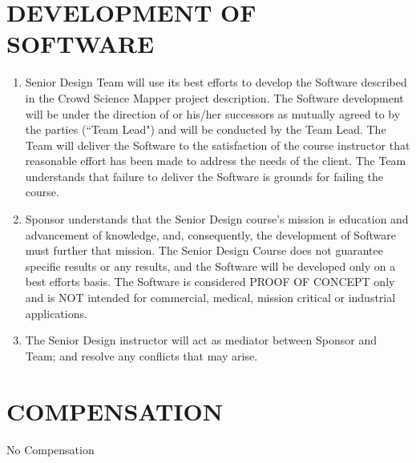 \documentclass[11pt]{article}
\begin{document}
\section{DEVELOPMENT OF SOFTWARE }
\begin{enumerate}  \itemsep4pt \parskip0pt 
\item  Senior Design Team will use its best efforts to develop the Software described in the Crowd Science Mapper project description. The Software development will be under the direction of  or his/her successors as mutually agreed to by the parties (``Team Lead") and will be conducted by the Team Lead.  The Team will deliver the Software to the satisfaction of the course instructor that reasonable effort has been made to address the needs of the client.  The Team understands that failure to deliver the Software is grounds for failing the course. 

\item  Sponsor understands that the Senior Design course's mission is education and advancement of knowledge, and, consequently, the development of Software must further that mission. The Senior Design Course does not guarantee specific results or any results, and the Software will be developed only on a best efforts basis.  The Software is considered PROOF OF CONCEPT only and is NOT intended for commercial, medical, mission critical or industrial applications.

\item  The Senior Design instructor will act as mediator between Sponsor and Team; and resolve any conflicts that may arise.
\end{enumerate}

\section{COMPENSATION}

No Compensation
\end{document}
